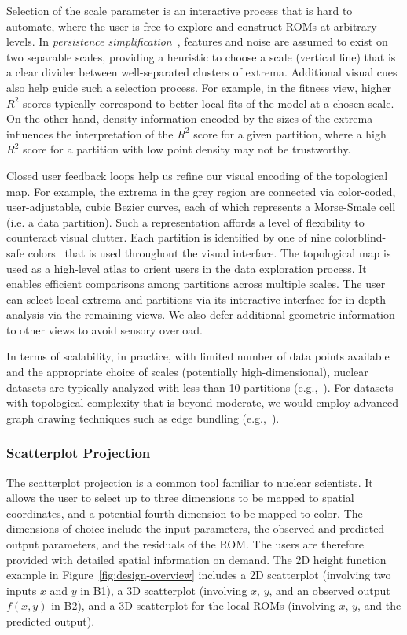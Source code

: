 Selection of the scale parameter is an interactive process that is hard to automate, where the user is free to explore and construct ROMs at arbitrary levels.
%
In \emph{persistence simplification}~\cite{Cohen-SteinerEdelsbrunnerHarer2007,EdelsbrunnerLetscherZomorodian2000}, features and noise are assumed to exist on two separable scales, providing a heuristic to choose a scale (vertical line) that is a clear divider between well-separated clusters of extrema.
%
Additional visual cues also help guide such a selection process.
%
For example, in the fitness view, higher $R^2$ scores typically correspond to better local fits of the model at a chosen scale.
%
On the other hand, density information encoded by the sizes of the extrema  influences the interpretation of the $R^2$ score for a given partition, where a high $R^2$ score for a partition with low point density may not be trustworthy.

Closed user feedback loops help us refine our visual encoding of the topological map.
%
For example, the extrema in the grey region are connected via color-coded, user-adjustable, cubic Bezier curves, each of which represents a Morse-Smale cell (i.e. a data partition).
%
Such a representation affords a level of flexibility to counteract visual clutter.
%
Each partition is identified by one of nine colorblind-safe colors~\cite{Tol2012} that is used throughout
the visual interface.
%
The topological map is used as a high-level atlas to orient users in the data exploration process.
%
It enables efficient comparisons among partitions across multiple scales.
%
The user can select local extrema and partitions via its interactive interface for in-depth analysis via the remaining views.
%
We also defer additional geometric information to other views to avoid sensory overload.

In terms of scalability, in practice, with limited number of data points available and the appropriate choice of scales (potentially high-dimensional), nuclear datasets are typically analyzed with less than 10 partitions (e.g.,~\cite{MaljovecLiuWang2015,MaljovecWangMandelli2013a,MaljovecWangPascucci2013}).
%
For datasets with topological complexity that is beyond moderate, we would employ advanced graph drawing techniques such as edge bundling (e.g.,~\cite{CuiZhouQu2008}).

\subsubsection{Scatterplot Projection}
\label{sec:scatterPlot}
The scatterplot projection is a common tool familiar to nuclear scientists.
%
It allows the user to select up to three dimensions to be mapped to spatial coordinates, and a potential fourth dimension to be mapped to color.
%
The dimensions of choice include the input parameters, the observed and predicted output parameters, and the residuals of the ROM.
%
The users are therefore provided with detailed spatial information on demand.
%
The 2D height function example in Figure~\ref{fig:design-overview} includes a 2D scatterplot (involving two inputs $x$ and $y$ in B1), a 3D scatterplot (involving $x$, $y$, and an observed output $f(x,y)$ in B2), and a 3D scatterplot for the local ROMs (involving $x$, $y$, and the predicted output).



